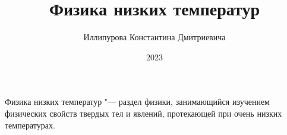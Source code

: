 \documentclass[bachelor,och,referat]{SCWorks_corrected}
\begin{document}

\title{Физика низких температур}






\author{Иллипурова Константина Дмитриевича}

\date{2023}

\maketitle
\tableofcontents

\intro
Физика низких температур "--- раздел физики, занимающийся изучением физических свойств твердых тел и явлений, протекающей при очень низких температурах. 
\end{document}
